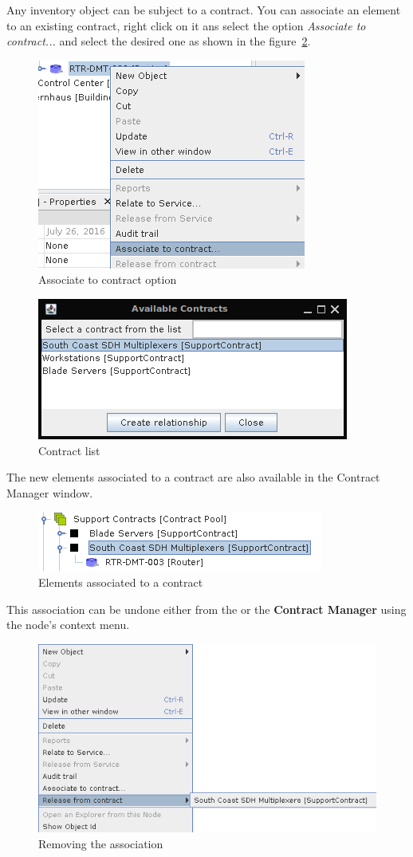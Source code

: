 \documentclass[a4paper]{article}
\begin{document}
		Any inventory object can be subject to a contract. You can associate an element to an existing contract, right click on it ans select the option \textit{Associate to contract...} and select the desired one as shown in the figure~\ref{fig:contract_manager_contract_list}.
		\begin{figure}[h!]
			\centering
			\includegraphics[width=0.4\linewidth]{img/contract_manager_associate_option.png}
			\caption{Associate to contract option}
			\label{fig:contract_manager_associate_option}
		\end{figure}		
		\newline
		\begin{figure}[h!]
			\centering
			\includegraphics[width=0.4\linewidth]{img/contract_manager_contract_list.png}
			\caption{Contract list}
			\label{fig:contract_manager_contract_list}
		\end{figure}
		
		The new elements associated to a contract are also available in the Contract Manager window.
		\begin{figure}[h!]
			\centering
			\includegraphics[width=0.4\linewidth]{img/contract_manager_elements.png}
			\caption{Elements associated to a contract}
			\label{fig:contract_manager_elements}
		\end{figure}
		
		This association can be undone either from the \textbf{} or the \textbf{Contract Manager} using the node's context menu.
		\begin{figure}[h!]
			\centering
			\includegraphics[width=0.6\linewidth]{img/contract_manager_release_from_contract.png}
			\caption{Removing the association}
			\label{fig:contract_manager_release_from_contract}
		\end{figure}
		
\end{document}
